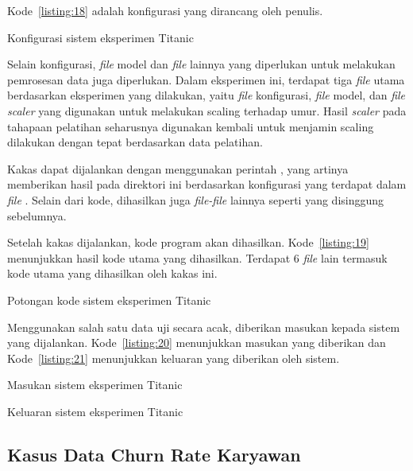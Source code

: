 Kode~\ref{listing:18} adalah konfigurasi yang dirancang oleh penulis.

\begin{code}
	\caption{Konfigurasi sistem eksperimen Titanic}\label{listing:18}
\end{code}

Selain konfigurasi, \textit{file} model dan \textit{file} lainnya yang diperlukan untuk melakukan pemrosesan data juga diperlukan.
Dalam eksperimen ini, terdapat tiga \textit{file} utama berdasarkan eksperimen yang dilakukan, yaitu \textit{file} konfigurasi, \textit{file} model, dan \textit{file scaler}  yang digunakan untuk melakukan scaling terhadap umur.
Hasil \textit{scaler} pada tahapaan pelatihan seharusnya digunakan kembali untuk menjamin scaling dilakukan dengan tepat berdasarkan data pelatihan.

Kakas dapat dijalankan dengan menggunakan perintah , yang artinya memberikan hasil pada direktori ini berdasarkan konfigurasi yang terdapat dalam \textit{file} .
Selain dari kode, dihasilkan juga \textit{file-file} lainnya seperti yang disinggung sebelumnya.

Setelah kakas dijalankan, kode program akan dihasilkan.
Kode~\ref{listing:19} menunjukkan hasil kode utama yang dihasilkan.
Terdapat 6 \textit{file} lain termasuk kode utama yang dihasilkan oleh kakas ini.

\begin{code}
	\caption{Potongan kode sistem eksperimen Titanic}\label{listing:19}
\end{code}

Menggunakan salah satu data uji secara acak, diberikan masukan kepada sistem yang dijalankan.
Kode~\ref{listing:20} menunjukkan masukan yang diberikan dan Kode~\ref{listing:21} menunjukkan keluaran yang diberikan oleh sistem.

\begin{code}
	\caption{Masukan sistem eksperimen Titanic}\label{listing:20}
\end{code}

\begin{code}
	\caption{Keluaran sistem eksperimen Titanic}\label{listing:21}
\end{code}

\subsection{Kasus Data Churn Rate Karyawan}\label{section:churn-rate-case}

